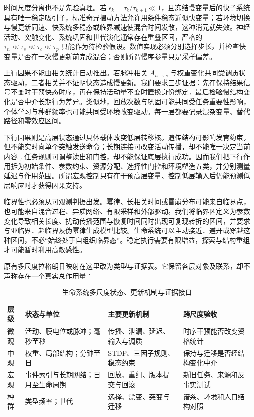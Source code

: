 时间尺度分离也不是先验真理。若 $\epsilon_k=\tau_k/\tau_{k+1}\ll1$，且冻结慢变量后的快子系统具有唯一稳定吸引子，标准奇异摄动方法允许用条件稳态近似快变量；若环境切换与慢更新同速、快系统多稳态或临界减速使混合时间发散，这种消元就失效。神经活动、突触变化、系统巩固和世代演化通常存在重叠区间，严格的 $\tau_n\ll\tau_s\ll\tau_c\ll\tau_p$ 只能作为待检验假设。数值实现必须分别选择步长，并检查快变量是否在一次慢更新前完成混合；否则所谓慢序参量只是采样偏差。

上行因果不能由相关统计自动推出。若脉冲相关 $A_{n\to s}$ 与权重变化共同受调质状态驱动，二者相关并不证明快态造成慢更新。我们要求三步证据：先在保持结果信号不变时干预快态时序，再在保持活动量不变时置换身份绑定，最后检验慢结构变化是否中介长期行为差异。类似地，回放次数与巩固可能共同受任务重要性影响，个体学习与种群频率也可能共同受环境改变驱动。每一层都要记录混杂变量、替代路径和零效应区间。

下行因果则是高层状态通过具体载体改变低层转移核。遗传结构可影响发育约束，但不能实时向单个突触发送命令；长期连接可改变活动传播，却不能唯一决定当前内容；任务规则可调整读出和门控，却不能保证底层执行成功。因而我们把下行作用拆为初始条件、参数约束、资源分配、选择性门控和环境塑造五类，并分别测量延迟与作用范围。所谓宏观控制只有在干预高层变量、控制低层输入后仍能预测低层响应时才获得因果支持。

临界性也必须从可观测判据出发。幂律、长相关时间或雪崩分布可能来自临界点，也可能来自混合过程、异质网络、有限采样和外部驱动。我们将临界区定义为参数变化导致相关长度、扰动传播范围与恢复时间同时出现可复现转折的区间，并要求与亚临界、超临界及伪幂律生成模型比较。生命系统可以主动接近、避开或穿越这种区间，不必“始终处于自组织临界态”。稳定执行需要有限增益，探索与结构重组才可能暂时利用高敏感性。

原有多尺度拉格朗日映射在这里改为类型与证据表。它保留各层对象及联系，却不声称存在一个真实总作用量：
\begin{table}[htbp]
\centering
\small
\renewcommand{\arraystretch}{1.35}
\begin{tabularx}{\textwidth}{l|X|X|X}
\toprule
\textbf{层级} & \textbf{状态与单位} & \textbf{主要更新机制} & \textbf{跨尺度验收} \\
\midrule
微观 & 活动、膜电位或脉冲；毫秒至秒 & 传播、泄漏、延迟、输入与调质 & 时序干预能否改变资格统计 \\
中观 & 权重、局部结构；分钟至日 & STDP、三因子规则、稳态约束 & 保持与迁移是否经结构变化中介 \\
宏观 & 事件索引与长期网络；日月至生命周期 & 回放、重组、版本提交与回滚 & 新旧任务、来源和反事实测试 \\
种群 & 类型频率；世代 & 选择、漂变、突变与迁移 & 谱系、环境和人口结构对照 \\
\bottomrule
\end{tabularx}
\caption{生命系统多尺度状态、更新机制与证据接口}
\label{tab:life_lagrangian_scales}
\end{table}

